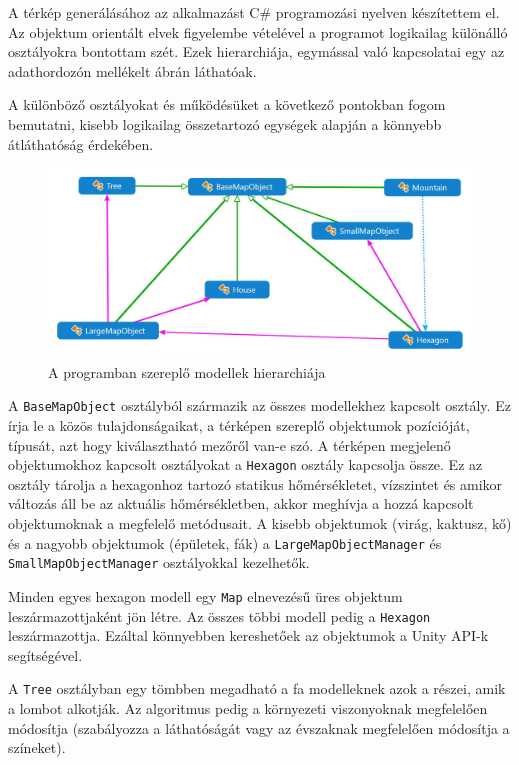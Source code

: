 
A térkép generálásához az alkalmazást C\# programozási nyelven készítettem el. Az objektum orientált elvek figyelembe vételével a programot logikailag különálló osztályokra bontottam szét. Ezek hierarchiája, egymással való kapcsolatai egy az adathordozón mellékelt ábrán láthatóak.

A különböző osztályokat és működésüket a következő pontokban fogom bemutatni, kisebb logikailag összetartozó egységek alapján a könnyebb átláthatóság érdekében.

\begin{figure}[h!]
\centering
\includegraphics[scale=0.3]{kepek/White_modellek.JPG}
\caption{A programban szereplő modellek hierarchiája}
\label{fig:modellek}
\end{figure}


A \texttt{BaseMapObject} osztályból származik az összes modellekhez kapcsolt osztály. Ez írja le a közös tulajdonságaikat, a térképen szereplő objektumok pozícióját, típusát, azt hogy kiválasztható mezőről van-e szó. A térképen megjelenő objektumokhoz kapcsolt osztályokat a \texttt{Hexagon} osztály kapcsolja össze. Ez az osztály tárolja  a hexagonhoz tartozó statikus hőmérsékletet, vízszintet és amikor változás áll be az aktuális hőmérsékletben, akkor meghívja a hozzá kapcsolt objektumoknak a megfelelő metódusait. A kisebb objektumok (virág, kaktusz, kő) és a nagyobb objektumok (épületek, fák) a \texttt{LargeMapObjectManager} és \texttt{SmallMapObjectManager} osztályokkal kezelhetők.

Minden egyes hexagon modell egy \texttt{Map} elnevezésű üres objektum leszármazottjaként jön létre. Az összes többi modell pedig a \texttt{Hexagon} leszármazottja. Ezáltal könnyebben kereshetőek az objektumok a Unity API-k segítségével.

A \texttt{Tree} osztályban egy tömbben megadható a fa modelleknek azok a részei, amik a lombot alkotják. Az algoritmus pedig a környezeti viszonyoknak megfelelően módosítja (szabályozza a láthatóságát vagy az évszaknak megfelelően módosítja a színeket).

